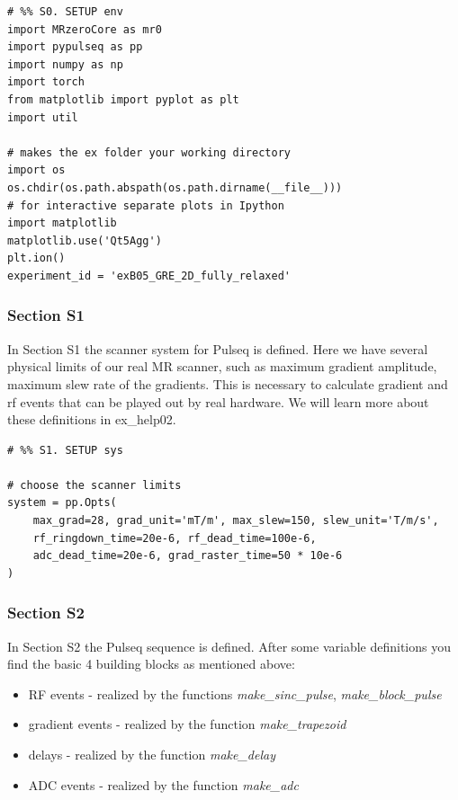\documentclass[a4paper,12pt]{extarticle}
\begin{document}
\begin{verbatim}
# %% S0. SETUP env
import MRzeroCore as mr0
import pypulseq as pp
import numpy as np
import torch
from matplotlib import pyplot as plt
import util

# makes the ex folder your working directory
import os
os.chdir(os.path.abspath(os.path.dirname(__file__)))
# for interactive separate plots in Ipython
import matplotlib
matplotlib.use('Qt5Agg')
plt.ion()
experiment_id = 'exB05_GRE_2D_fully_relaxed'
\end{verbatim}

\subsubsection{Section S1}
In Section S1 the scanner system for Pulseq is defined.
Here we have several physical limits of our real MR scanner, such as maximum gradient amplitude, maximum slew rate of the gradients. This is necessary to calculate gradient and rf events that can be played out by real hardware. We will learn more about these definitions in ex\_help02.

\begin{verbatim}
# %% S1. SETUP sys

# choose the scanner limits
system = pp.Opts(
    max_grad=28, grad_unit='mT/m', max_slew=150, slew_unit='T/m/s',
    rf_ringdown_time=20e-6, rf_dead_time=100e-6,
    adc_dead_time=20e-6, grad_raster_time=50 * 10e-6
)

\end{verbatim}

\subsubsection{Section S2}
In Section S2 the Pulseq sequence is defined. After some variable definitions you find the basic 4 building blocks as mentioned above:
\begin{itemize}
\item RF events - realized by the functions \emph{make\_sinc\_pulse}, \emph{make\_block\_pulse}
\item gradient events - realized by the function \emph{make\_trapezoid}
\item delays - realized by the function \emph{make\_delay}
\item ADC events  - realized by the function \emph{make\_adc}
\end{itemize}
\end{document}
